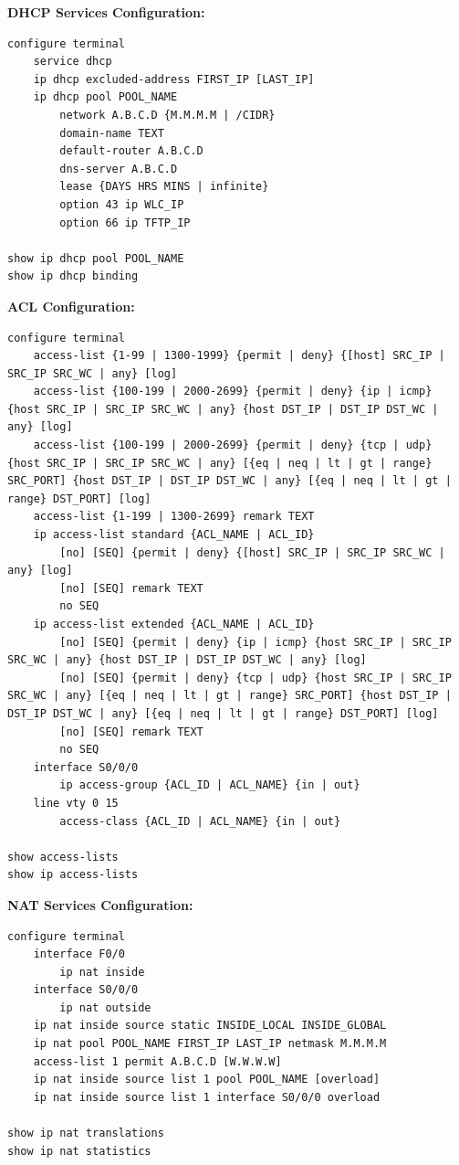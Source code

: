 \documentclass[12pt]{article}
\begin{document}
	\textbf{DHCP Services Configuration:}
	\begin{lstlisting}
configure terminal
	service dhcp
	ip dhcp excluded-address FIRST_IP [LAST_IP]
	ip dhcp pool POOL_NAME
		network A.B.C.D {M.M.M.M | /CIDR}
		domain-name TEXT
		default-router A.B.C.D
		dns-server A.B.C.D
		lease {DAYS HRS MINS | infinite}
		option 43 ip WLC_IP
		option 66 ip TFTP_IP

show ip dhcp pool POOL_NAME
show ip dhcp binding
	\end{lstlisting}

	\textbf{ACL Configuration:}
	\begin{lstlisting}
configure terminal
	access-list {1-99 | 1300-1999} {permit | deny} {[host] SRC_IP | SRC_IP SRC_WC | any} [log]
	access-list {100-199 | 2000-2699} {permit | deny} {ip | icmp} {host SRC_IP | SRC_IP SRC_WC | any} {host DST_IP | DST_IP DST_WC | any} [log]
	access-list {100-199 | 2000-2699} {permit | deny} {tcp | udp} {host SRC_IP | SRC_IP SRC_WC | any} [{eq | neq | lt | gt | range} SRC_PORT] {host DST_IP | DST_IP DST_WC | any} [{eq | neq | lt | gt | range} DST_PORT] [log]
	access-list {1-199 | 1300-2699} remark TEXT
	ip access-list standard {ACL_NAME | ACL_ID}
		[no] [SEQ] {permit | deny} {[host] SRC_IP | SRC_IP SRC_WC | any} [log]
		[no] [SEQ] remark TEXT
		no SEQ
	ip access-list extended {ACL_NAME | ACL_ID}
		[no] [SEQ] {permit | deny} {ip | icmp} {host SRC_IP | SRC_IP SRC_WC | any} {host DST_IP | DST_IP DST_WC | any} [log]
		[no] [SEQ] {permit | deny} {tcp | udp} {host SRC_IP | SRC_IP SRC_WC | any} [{eq | neq | lt | gt | range} SRC_PORT] {host DST_IP | DST_IP DST_WC | any} [{eq | neq | lt | gt | range} DST_PORT] [log]
		[no] [SEQ] remark TEXT
		no SEQ
	interface S0/0/0
		ip access-group {ACL_ID | ACL_NAME} {in | out}
	line vty 0 15
		access-class {ACL_ID | ACL_NAME} {in | out}

show access-lists
show ip access-lists
	\end{lstlisting}

	\textbf{NAT Services Configuration:}
	\begin{lstlisting}
configure terminal
	interface F0/0
		ip nat inside
	interface S0/0/0
		ip nat outside
	ip nat inside source static INSIDE_LOCAL INSIDE_GLOBAL
	ip nat pool POOL_NAME FIRST_IP LAST_IP netmask M.M.M.M
	access-list 1 permit A.B.C.D [W.W.W.W]
	ip nat inside source list 1 pool POOL_NAME [overload]
	ip nat inside source list 1 interface S0/0/0 overload

show ip nat translations
show ip nat statistics
	\end{lstlisting}
\end{document}
